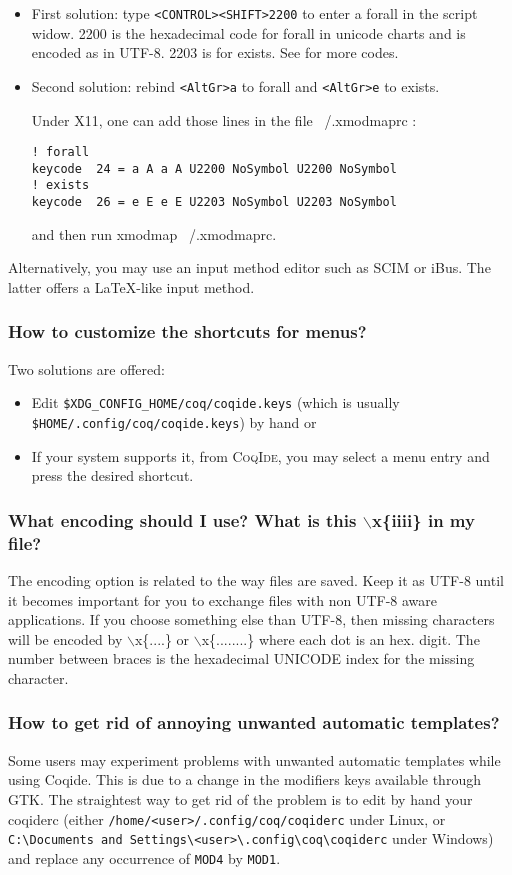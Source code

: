 \documentclass[a4paper,pdftex]{article}
\def\Question#1{\stepcounter{question}\subsubsection{#1}}
\def\CoqIde{\textsc{CoqIde}}
\begin{document}
\begin{itemize}
\item First solution: type \verb#<CONTROL><SHIFT>2200# to enter a forall in the script widow. 
	2200 is the hexadecimal code for forall in unicode charts and is encoded as 	
	in UTF-8.
	2203 is for exists. See  for more codes.
\item Second solution: rebind \verb#<AltGr>a# to forall and \verb#<AltGr>e# to exists.

       Under X11, one can add those lines in the file ~/.xmodmaprc :

\begin{verbatim}
! forall
keycode  24 = a A a A U2200 NoSymbol U2200 NoSymbol
! exists
keycode  26 = e E e E U2203 NoSymbol U2203 NoSymbol
\end{verbatim}
and then run xmodmap ~/.xmodmaprc.
\end{itemize}

	Alternatively, you may use an input method editor such as SCIM or iBus.
The latter offers a \LaTeX-like input method.

\Question{How to customize the shortcuts for menus?}
 Two solutions are offered:
\begin{itemize}
\item Edit \verb+$XDG_CONFIG_HOME/coq/coqide.keys+ (which is usually \verb+$HOME/.config/coq/coqide.keys+) by hand or
\item If your system supports it, from \CoqIde, you may select a menu entry and press the desired 
    shortcut. 
\end{itemize}

\Question{What encoding should I use? What is this $\backslash$x\{iiii\} in my file?}
 The encoding option is related to the way files are saved. 
 Keep it as UTF-8 until it becomes important for you to exchange files 
 with non UTF-8 aware applications.
 If you choose something else than UTF-8, then missing characters will 
 be encoded by $\backslash$x\{....\} or $\backslash$x\{........\}
 where each dot is an hex. digit. 
 The number between braces is the hexadecimal UNICODE index for the
  missing character.
    
\Question{How to get rid of annoying unwanted automatic templates?}

Some users may experiment problems with unwanted automatic
templates while using Coqide. This is due to a change in the
modifiers keys available through GTK. The straightest way to get
rid of the problem is to edit by hand your coqiderc (either
\verb|/home/<user>/.config/coq/coqiderc| under Linux, or \\
\verb|C:\Documents and Settings\<user>\.config\coq\coqiderc| under Windows) 
and replace any occurrence of \texttt{MOD4} by \texttt{MOD1}.
\end{document}
